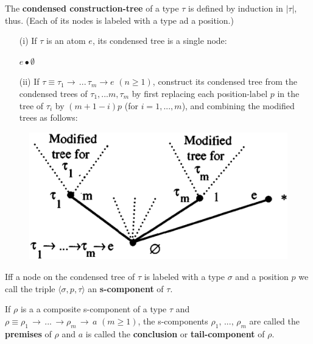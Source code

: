 \documentclass[a4paper,10pt]{article}
\begin{document}
\begin{mydef} The \textbf{condensed construction-tree} of a type $\tau$ is defined by induction in $|\tau|$, thus.
 (Each of its nodes is labeled with a type ad a position.)
 \begin{itemize}
  \item[(i)] If $\tau$ is an atom $e$, its condensed tree is a single node:
  \begin{center}
   $e \bullet \emptyset$
  \end{center}
  \item[(ii)] If $\tau \equiv \tau_1 \to\,...\,\tau_m\to e\,\,(n \geq 1)$, construct its condensed tree from the condensed trees of $\tau_1, ...m, \tau_m$
  by first replacing each position-label $p$ in the tree of $\tau_i$ by $(m + 1 - i)p$ (for $i = 1, ..., m$), and combining the modified trees as follows:
 \end{itemize}
\begin{figure}[h]
   \centering
   \includegraphics[scale=0.3]{fig5.png}
\end{figure}
 
\end{mydef}

\begin{mydef}[S-components] Iff a node on the condensed tree of $\tau$ is labeled with a type $\sigma$ and a position $p$ we call the triple $\langle\sigma, p,\tau\rangle$
an \textbf{s-component} of $\tau$. 
\end{mydef}

\begin{mydef} If $\rho$ is a a composite s-component of a type $\tau$ and $\rho \equiv \rho_1\,\to\,...\,\to \rho_m\,\to\,a\,\, (m \geq 1)$, the s-components
$\rho_1,\, ...,\, \rho_m$ are called the \textbf{premises} of $\rho$ and $a$ is called the \textbf{conclusion} or \textbf{tail-component} of $\rho$.
\end{mydef}
\end{document}
